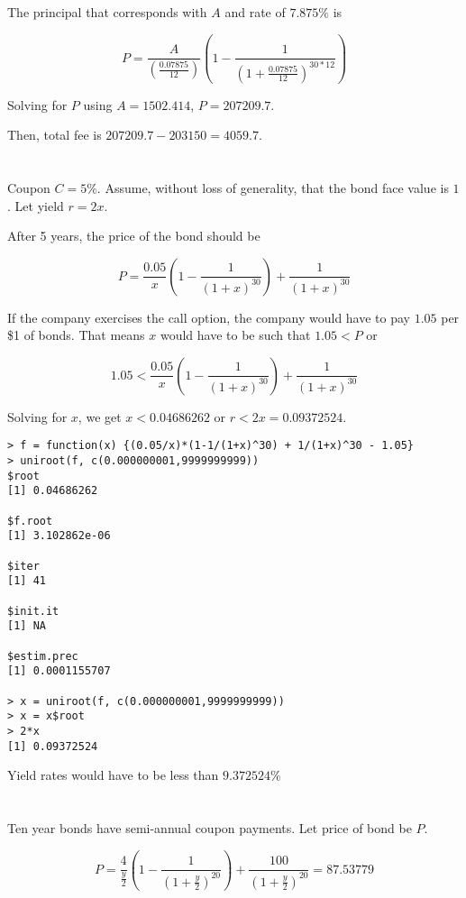 \documentclass[11pt]{scrartcl}
\begin{document}
The principal that corresponds with $A$ and rate of $7.875\%$ is

\[P = \frac{A}{\left( \frac{0.07875}{12} \right)} \left(1 - \frac{1}{\left(1+\frac{0.07875}{12}\right)^{30*12}} \right)\]

Solving for $P$ using $A = 1502.414$, $P = 207209.7$.

Then, total fee is $207209.7 - 203150 = 4059.7$.

\section{}

Coupon $C = 5\%$. Assume, without loss of generality, that the bond face value is $1$. Let yield $r = 2x$.

After 5 years, the price of the bond should be 

\[P = \frac{0.05}{x} \left(1 - \frac{1}{(1 + x)^{30}} \right) + \frac{1}{(1+x)^{30}}\]

If the company exercises the call option, the company would have to pay $1.05$ per \$1 of bonds. That means $x$ would have to be such that $1.05 < P$ or

\[1.05 < \frac{0.05}{x} \left(1 - \frac{1}{(1 + x)^{30}} \right) + \frac{1}{(1+x)^{30}}\]

Solving for $x$, we get $x < 0.04686262$ or $r < 2x = 0.09372524$.

\begin{lstlisting}
> f = function(x) {(0.05/x)*(1-1/(1+x)^30) + 1/(1+x)^30 - 1.05}
> uniroot(f, c(0.000000001,9999999999))
$root
[1] 0.04686262

$f.root
[1] 3.102862e-06

$iter
[1] 41

$init.it
[1] NA

$estim.prec
[1] 0.0001155707

> x = uniroot(f, c(0.000000001,9999999999))
> x = x$root
> 2*x
[1] 0.09372524
\end{lstlisting}

Yield rates would have to be less than $9.372524\%$

\section{}

Ten year bonds have semi-annual coupon payments. Let price of bond be $P$.

\[P = \frac{4}{\frac{y}{2}} \left( 1 - \frac{1}{(1+\frac{y}{2})^{20}}\right) + \frac{100}{(1+\frac{y}{2})^{20}} = 87.53779\]
\end{document}
